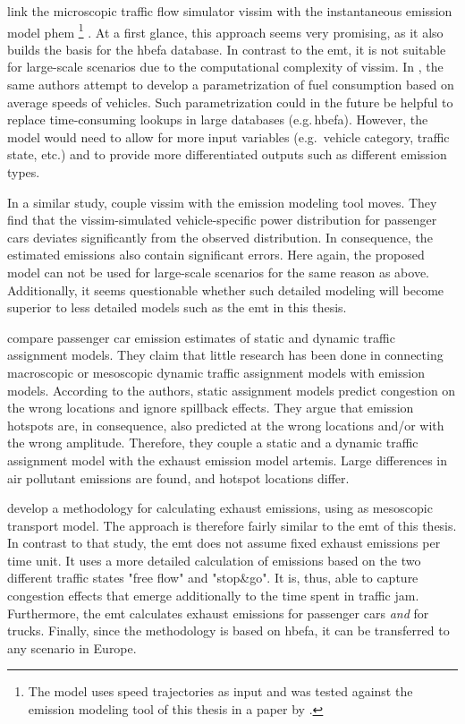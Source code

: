\citet{HirschmannEtAl_ITSC_2010} link the 
microscopic traffic flow simulator \acrshort{vissim} with the instantaneous 
emission model \acrshort{phem}%
%
\footnote{
%
The model uses speed trajectories as input and was tested against the emission 
modeling tool of this thesis in a paper by 
\citet{HuelsmannEtAl_LAS_2011}.
%
}%
. At a first glance, this approach seems very promising, as it also builds the 
basis for the \gls{hbefa} database. In contrast to the \gls{emt}, it is not 
suitable for large-scale scenarios due to the computational complexity of 
\acrshort{vissim}.
%
In \citet{Kraschl-HirschmannEtAl_FISTS_2011}, the same authors attempt to 
develop a parametrization of fuel consumption based on average speeds of 
vehicles. Such parametrization could in the future be helpful to replace 
time-consuming lookups in large databases (e.g.\,\gls{hbefa}). However, the 
model would need to allow for more input variables (e.g.\ vehicle category, 
traffic state, etc.) and to provide more differentiated outputs such as 
different emission types.

In a similar study, \citet{SongEtAl_TRR_2012} couple 
\acrshort{vissim} with the emission modeling tool \acrshort{moves}. They find 
that the \acrshort{vissim}-simulated vehicle-specific power distribution for 
passenger cars deviates significantly from the observed distribution. In 
consequence, the estimated emissions also contain significant errors. Here 
again, the proposed model can not be used for large-scale scenarios for the 
same reason as above. Additionally, it seems questionable whether such detailed 
modeling will become superior to less detailed models such as the \gls{emt} in 
this thesis.

\citet{WismansEtAl_TRB_2013} compare passenger car emission 
estimates of static and dynamic traffic assignment models. They claim that 
little research has been done in connecting macroscopic or mesoscopic dynamic 
traffic assignment models with emission models.
%
According to the authors, static assignment models predict congestion on the 
wrong locations and ignore spillback effects. They argue that emission 
hotspots are, in consequence, also predicted at the wrong locations and/or 
with the wrong amplitude.
%
Therefore, they couple a static and a dynamic traffic assignment model with 
the exhaust emission model \acrshort{artemis}. Large differences in air 
pollutant emissions are found, and hotspot locations differ.

\citet{HatzopoulouMiller_TransResD_2010} develop a methodology for 
calculating exhaust emissions, using  as mesoscopic transport 
model. The approach is therefore fairly similar to the \gls{emt} of this thesis.
%
In contrast to that study, the \gls{emt} does not assume fixed exhaust 
emissions per time unit. It uses a more detailed calculation of emissions based 
on the two different traffic states "free flow" and "stop\&go". It is, thus, 
able to capture congestion effects that emerge additionally to the time spent 
in traffic jam. 
Furthermore, the \gls{emt} calculates exhaust emissions for passenger cars 
\emph{and} for trucks. Finally, since the methodology is based on \gls{hbefa}, 
it can be transferred to any scenario in Europe.

